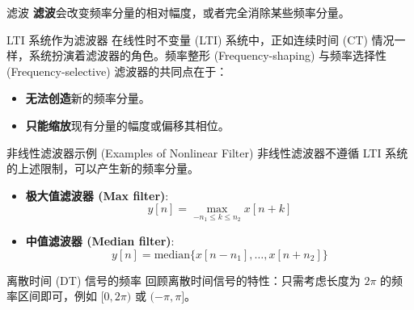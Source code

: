 \documentclass[
  ignorenonframetext,
]{beamer}
\providecommand{\tightlist}{%
  \setlength{\itemsep}{0pt}\setlength{\parskip}{0pt}}
\begin{document}
\begin{frame}{滤波}
\protect{}\label{ux6ee4ux6ce2-3}
\textbf{滤波}会改变频率分量的相对幅度，或者完全消除某些频率分量。

\begin{block}{LTI 系统作为滤波器}
\protect{}\label{lti-ux7cfbux7edfux4f5cux4e3aux6ee4ux6ce2ux5668}
在线性时不变量 (LTI) 系统中，正如连续时间 (CT)
情况一样，系统扮演着滤波器的角色。频率整形 (Frequency-shaping)
与频率选择性 (Frequency-selective) 滤波器的共同点在于：

\begin{itemize}
\tightlist
\item
  \textbf{无法创造}新的频率分量。
\item
  \textbf{只能缩放}现有分量的幅度或偏移其相位。
\end{itemize}
\end{block}

\begin{block}{非线性滤波器示例 (Examples of Nonlinear Filter)}
\protect{}\label{ux975eux7ebfux6027ux6ee4ux6ce2ux5668ux793aux4f8b-examples-of-nonlinear-filter}
非线性滤波器不遵循 LTI 系统的上述限制，可以产生新的频率分量。

\begin{itemize}
\tightlist
\item
  \textbf{极大值滤波器 (Max filter)}:
  \[y[n] = \max_{-n_1 \leq k \leq n_2} x[n + k]\]
\item
  \textbf{中值滤波器 (Median filter)}:
  \[y[n] = \text{median} \{x[n - n_1], \dots, x[n + n_2]\}\]
\end{itemize}
\end{block}

\begin{block}{离散时间 (DT) 信号的频率}
\protect{}\label{ux79bbux6563ux65f6ux95f4-dt-ux4fe1ux53f7ux7684ux9891ux7387}
回顾离散时间信号的特性：只需考虑长度为 \(2\pi\) 的频率区间即可，例如
\([0, 2\pi)\) 或 \((-\pi, \pi]\)。
\end{block}
\end{frame}
\end{document}
